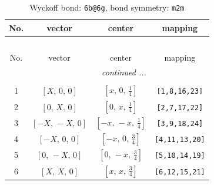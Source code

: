 \documentclass[fleqn,8pt]{jsarticle}
\begin{document}
\begin{longtable}{cccc}
\caption{Wyckoff bond: {\tt 6b@6g}, bond symmetry: {\tt m2m}}
 \\
 \hline \hline
No. & vector & center & mapping \\ \hline \endfirsthead

\multicolumn{3}{l}{\tablename\ \thetable{}} \\
 \hline \hline
No. & vector & center & mapping \\ \hline \endhead

 \hline \hline
\multicolumn{3}{r}{\footnotesize\it continued ...} \\ \endfoot

 \hline \hline
\multicolumn{3}{r}{} \\ \endlastfoot

1 & $\left[ X,\, 0,\, 0 \right]$ & $\left[ x,\, 0,\, \frac{1}{4} \right]$ & {\tt [1,8,16,23]} \\ \hline
2 & $\left[ 0,\, X,\, 0 \right]$ & $\left[ 0,\, x,\, \frac{1}{4} \right]$ & {\tt [2,7,17,22]} \\ \hline
3 & $\left[ - X,\, - X,\, 0 \right]$ & $\left[ - x,\, - x,\, \frac{1}{4} \right]$ & {\tt [3,9,18,24]} \\ \hline
4 & $\left[ - X,\, 0,\, 0 \right]$ & $\left[ - x,\, 0,\, \frac{3}{4} \right]$ & {\tt [4,11,13,20]} \\ \hline
5 & $\left[ 0,\, - X,\, 0 \right]$ & $\left[ 0,\, - x,\, \frac{3}{4} \right]$ & {\tt [5,10,14,19]} \\ \hline
6 & $\left[ X,\, X,\, 0 \right]$ & $\left[ x,\, x,\, \frac{3}{4} \right]$ & {\tt [6,12,15,21]} \\
\end{longtable}
\renewcommand{\arraystretch}{1.2}
\end{document}
